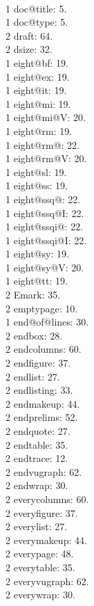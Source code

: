 \\1 doc@title: 5.
\\1 doc@type: 5.
\\2 draft: 64.
\\2 dsize: 32.
\\1 eight@bf: 19.
\\1 eight@ex: 19.
\\1 eight@it: 19.
\\1 eight@mi: 19.
\\1 eight@mi@V: 20.
\\1 eight@rm: 19.
\\1 eight@rm@: 22.
\\1 eight@rm@V: 20.
\\1 eight@sl: 19.
\\1 eight@ss: 19.
\\1 eight@ssq@: 22.
\\1 eight@ssq@I: 22.
\\1 eight@ssqi@: 22.
\\1 eight@ssqi@I: 22.
\\1 eight@sy: 19.
\\1 eight@sy@V: 20.
\\1 eight@tt: 19.
\\2 Emark: 35.
\\2 emptypage: 10.
\\1 end@of@lines: 30.
\\2 endbox: 28.
\\2 endcolumns: 60.
\\2 endfigure: 37.
\\2 endlist: 27.
\\2 endlisting: 33.
\\2 endmakeup: 44.
\\2 endprelims: 52.
\\2 endquote: 27.
\\2 endtable: 35.
\\2 endtrace: 12.
\\2 endvugraph: 62.
\\2 endwrap: 30.
\\2 everycolumns: 60.
\\2 everyfigure: 37.
\\2 everylist: 27.
\\2 everymakeup: 44.
\\2 everypage: 48.
\\2 everytable: 35.
\\2 everyvugraph: 62.
\\2 everywrap: 30.
